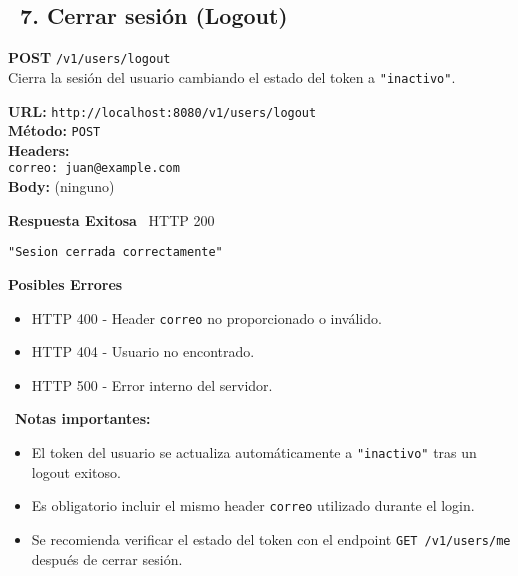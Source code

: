 \subsection*{\faServer\ 7. Cerrar sesión (Logout)}

\begin{tcolorbox}[endpoint]
    \textbf{POST} \texttt{/v1/users/logout}\\
    Cierra la sesión del usuario cambiando el estado del token a \texttt{"inactivo"}.
\end{tcolorbox}

\begin{tcolorbox}[request]
    \textbf{URL:} \textcolor{urlColor}{\texttt{http://localhost:8080/v1/users/logout}}\\
    \textbf{Método:} \textcolor{methodColor}{\texttt{POST}}\\
    \textbf{Headers:}\\
    \textcolor{headerColor}{\texttt{correo: juan@example.com}}\\
    \textbf{Body:} (ninguno)
\end{tcolorbox}

\begin{tcolorbox}[response]
    \textbf{Respuesta Exitosa} \faCheckCircle\ \textcolor{successColor}{HTTP 200}
    \begin{verbatim}
"Sesion cerrada correctamente"
    \end{verbatim}
    
    \textbf{Posibles Errores} \faExclamationTriangle
    \begin{itemize}
        \item \textcolor{errorColor}{HTTP 400} - Header \texttt{correo} no proporcionado o inválido.
        \item \textcolor{errorColor}{HTTP 404} - Usuario no encontrado.
        \item \textcolor{errorColor}{HTTP 500} - Error interno del servidor.
    \end{itemize}
\end{tcolorbox}

\begin{tcolorbox}[notes]
    \faInfoCircle\ \textbf{Notas importantes:}
    \begin{itemize}
        \item El token del usuario se actualiza automáticamente a \texttt{"inactivo"} tras un logout exitoso.
        \item Es obligatorio incluir el mismo header \texttt{correo} utilizado durante el login.
        \item Se recomienda verificar el estado del token con el endpoint \texttt{GET /v1/users/me} después de cerrar sesión.
    \end{itemize}
\end{tcolorbox}